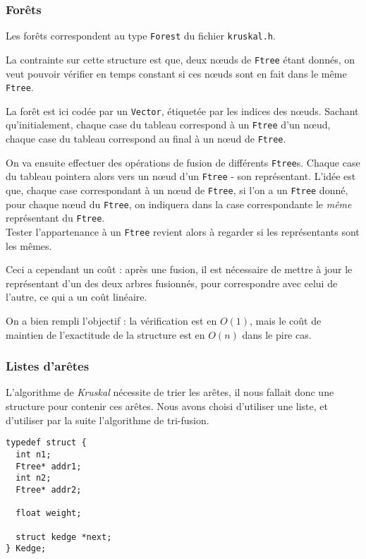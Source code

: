 \documentclass[a4paper]{article}
\begin{document}
\subsubsection{Forêts}

Les forêts correspondent au type \texttt{Forest} du fichier \texttt{kruskal.h}.

La contrainte sur cette structure est que, deux nœuds de \texttt{Ftree} étant donnés, on veut pouvoir vérifier en temps constant si ces nœuds sont en fait dans le même \texttt{Ftree}.

La forêt est ici codée par un \texttt{Vector}, étiquetée par les indices des nœuds. Sachant qu'initialement, chaque case du tableau correspond à un \texttt{Ftree} d'un nœud, chaque case du tableau correspond au final à un nœud de \texttt{Ftree}.

On va ensuite effectuer des opérations de fusion de différents \texttt{Ftree}s. Chaque case du tableau pointera alors vers un nœud d'un \texttt{Ftree} - son représentant. L'idée est que, chaque case correspondant à un nœud de \texttt{Ftree}, si l'on a un \texttt{Ftree} donné, pour chaque nœud du \texttt{Ftree}, on indiquera dans la case correspondante le \textit{même} représentant du \texttt{Ftree}.\\
Tester l'appartenance à un \texttt{Ftree} revient alors à regarder si les représentants sont les mêmes.

Ceci a cependant un coût : après une fusion, il est nécessaire de mettre à jour le représentant d'un des deux arbres fusionnés, pour correspondre avec celui de l'autre, ce qui a un coût linéaire.

On a bien rempli l'objectif : la vérification est en $O(1)$, mais le coût de maintien de l'exactitude de la structure est en $O(n)$ dans le pire cas.

\subsubsection{Listes d'arêtes}

L'algorithme de \emph{Kruskal} nécessite de trier les arêtes, il nous fallait donc une structure pour contenir ces arêtes. Nous avons choisi d'utiliser une liste, et d'utiliser par la suite l'algorithme de tri-fusion.

\begin{verbatim}
typedef struct {
  int n1;
  Ftree* addr1;
  int n2;
  Ftree* addr2;

  float weight;

  struct kedge *next;
} Kedge;
\end{verbatim}
\end{document}
